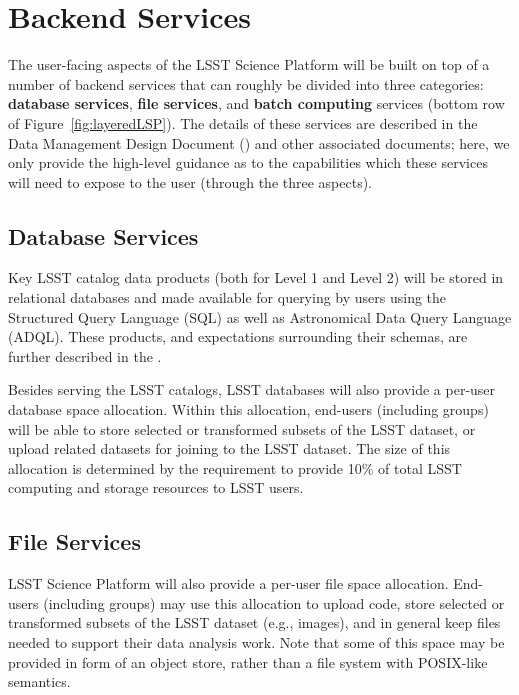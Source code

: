 \section{Backend Services\label{sec:backend}}

The user-facing aspects of the LSST Science Platform will be built on top of a number of backend services that can roughly be divided into three categories: \textbf{database services}, \textbf{file services}, and \textbf{batch computing} services (bottom row of Figure~\ref{fig:layeredLSP}). The details of these services are described in the Data Management Design Document () and other associated documents; here, we only provide the high-level guidance as to the capabilities which these services will need to expose to the user (through the three aspects).

\subsection{Database Services}

Key LSST catalog data products (both for Level 1 and Level 2) will be stored in relational databases and made available for querying by users using the Structured Query Language (SQL) as well as Astronomical Data Query Language (ADQL). These products, and expectations surrounding their schemas, are further described in the \DPDD.

Besides serving the LSST catalogs, LSST databases will also provide a per-user database space allocation. Within this allocation, end-users (including groups) will be able to store selected or transformed subsets of the LSST dataset, or upload related datasets for joining to the LSST dataset. The size of this allocation is determined by the \SRD requirement to provide 10\% of total LSST computing and storage resources to LSST users.

\subsection{File Services}

LSST Science Platform will also provide a per-user file space allocation. End-users (including groups) may use this allocation to upload code, store selected or transformed subsets of the LSST dataset (e.g., images), and in general keep files needed to support their data analysis work. Note that some of this space may be provided in form of an object store, rather than a file system with POSIX-like semantics.

